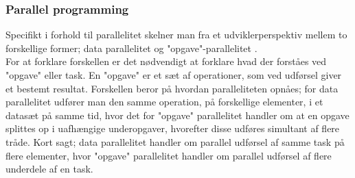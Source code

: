 \subsubsection*{Parallel programming}
Specifikt i forhold til parallelitet skelner man fra et udviklerperspektiv mellem to forskellige former; data parallelitet og "opgave"\mbox{}-parallelitet \cite{parallelism1}\cite{parallelism2}.\\
For at forklare forskellen er det nødvendigt at forklare hvad der forståes ved "opgave" eller task. En "opgave" er et sæt af operationer, som ved udførsel giver et bestemt resultat. Forskellen beror på hvordan paralleliteten opnåes; for data parallelitet udfører man den samme operation, på forskellige elementer, i et datasæt på samme tid, hvor det for "opgave" parallelitet handler om at en opgave splittes op i uafhængige underopgaver, hvorefter disse udføres simultant af flere tråde. Kort sagt; data parallelitet handler om parallel udførsel af samme task på flere elementer, hvor "opgave" parallelitet handler om parallel udførsel af flere underdele af en task.